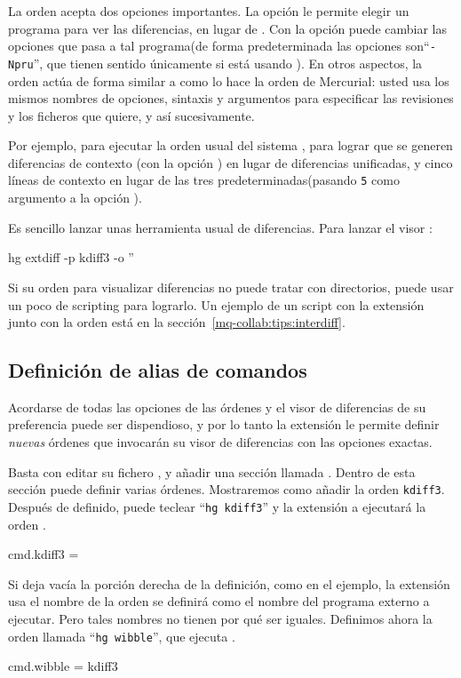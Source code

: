 La orden  acepta dos opciones importantes.
La opción  le permite elegir un programa
para ver las diferencias, en lugar de .  Con la opción
 puede cambiar las opciones que
 pasa a tal programa(de forma predeterminada
las opciones son``\texttt{-Npru}'', que tienen sentido únicamente si
está usando ).  En otros aspectos, la orden
 actúa de forma similar a como lo hace la
orden  de Mercurial: usted usa los mismos nombres de
opciones, sintaxis y argumentos para especificar las revisiones y los
ficheros que quiere, y así sucesivamente.

Por ejemplo, para ejecutar la orden usual del sistema ,
para lograr que se generen diferencias de contexto (con la opción
) en lugar de diferencias unificadas, y cinco líneas
de contexto en lugar de las tres predeterminadas(pasando \texttt{5}
como argumento a la opción ).

Es sencillo lanzar unas herramienta usual de diferencias.  Para lanzar
el visor :
\begin{codesample2}
  hg extdiff -p kdiff3 -o ''
\end{codesample2}

Si su orden para visualizar diferencias no puede tratar con
directorios, puede usar un poco de scripting para lograrlo.  Un
ejemplo de un script con la extensión  junto con la orden
 está en la sección~\ref{mq-collab:tips:interdiff}.

\subsection{Definición de alias de comandos}

Acordarse de todas las opciones de las órdenes
 y el visor de diferencias de su preferencia
puede ser dispendioso, y por lo tanto la extensión  le
permite definir \emph{nuevas} órdenes que invocarán su visor de
diferencias con las opciones exactas.

Basta con editar su fichero \hgrc, y añadir una sección llamada
.  Dentro de esta sección puede definir varias
órdenes. Mostraremos como añadir la orden \texttt{kdiff3}.  Después de
definido, puede teclear ``\texttt{hg kdiff3}'' y la extensión a
 ejecutará la orden .
\begin{codesample2}
  [extdiff]
  cmd.kdiff3 =
\end{codesample2}
Si deja vacía la porción derecha de la definición, como en el ejemplo,
la extensión  usa el nombre de la orden se definirá
como el nombre del programa externo a ejecutar.  Pero tales nombres no
tienen por qué ser iguales.  Definimos ahora la orden llamada
 ``\texttt{hg wibble}'', que ejecuta .
\begin{codesample2}
  [extdiff]
  cmd.wibble = kdiff3
\end{codesample2}

